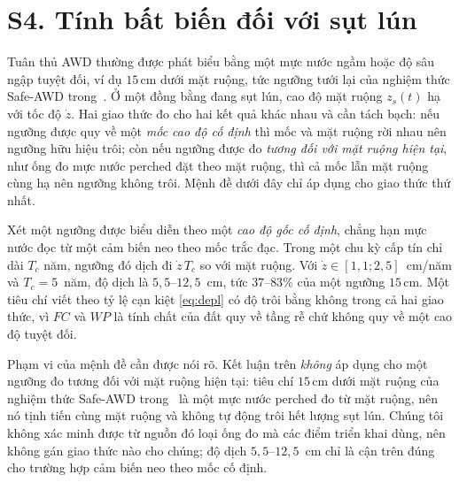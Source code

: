 \section*{S4. Tính bất biến đối với sụt lún}

Tuân thủ AWD thường được phát biểu bằng một mực nước ngầm hoặc độ sâu ngập tuyệt
đối, ví dụ $15$\,cm dưới mặt ruộng, tức ngưỡng tưới lại của nghiệm thức Safe-AWD
trong~\cite{balaine2019}. Ở một đồng bằng đang sụt lún, cao độ mặt ruộng $z_s(t)$ hạ
với tốc độ $\dot z$. Hai giao thức đo cho hai kết quả khác nhau và cần tách bạch:
nếu ngưỡng được quy về một \emph{mốc cao độ cố định} thì mốc và mặt ruộng rời nhau
nên ngưỡng hữu hiệu trôi; còn nếu ngưỡng được đo \emph{tương đối với mặt ruộng hiện
tại}, như ống đo mực nước perched đặt theo mặt ruộng, thì cả mốc lẫn mặt ruộng cùng
hạ nên ngưỡng không trôi. Mệnh đề dưới đây chỉ áp dụng cho giao thức thứ nhất.

\begin{proposition}
\label{prop:subsid}
Xét một ngưỡng được biểu diễn theo một \emph{cao độ gốc cố định}, chẳng hạn mực
nước đọc từ một cảm biến neo theo mốc trắc đạc. Trong một chu kỳ cấp tín chỉ dài
$T_c$ năm, ngưỡng đó dịch đi $\dot z\,T_c$ so với mặt ruộng. Với
$\dot z\in[1{,}1;2{,}5]$~cm/năm và $T_c=5$~năm, độ dịch là $5{,}5$--$12{,}5$~cm,
tức $37$--$83\%$ của một ngưỡng $15$\,cm. Một tiêu chí viết theo tỷ lệ cạn kiệt
\eqref{eq:depl} có độ trôi bằng không trong cả hai giao thức, vì $FC$ và $WP$ là
tính chất của đất quy về tầng rễ chứ không quy về một cao độ tuyệt đối.
\end{proposition}

Phạm vi của mệnh đề cần được nói rõ. Kết luận trên \emph{không} áp dụng cho một
ngưỡng đo tương đối với mặt ruộng hiện tại: tiêu chí $15$\,cm dưới mặt ruộng của
nghiệm thức Safe-AWD trong~\cite{balaine2019} là một mực nước perched đo từ mặt
ruộng, nên nó tịnh tiến cùng mặt ruộng và không tự động trôi hết lượng sụt lún.
Chúng tôi không xác minh được từ nguồn đó loại ống đo mà các điểm triển khai dùng,
nên không gán giao thức nào cho chúng; độ dịch $5{,}5$--$12{,}5$~cm chỉ là cận trên
đúng cho trường hợp cảm biến neo theo mốc cố định.

